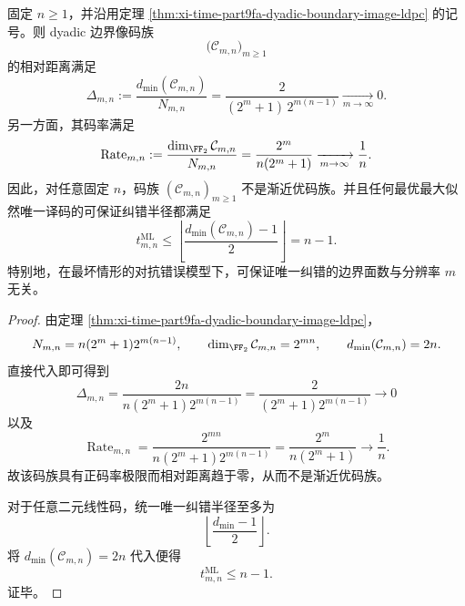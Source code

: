 \begin{corollary}\label{cor:xi-time-part65a-dyadic-boundary-code-not-asymptotically-good}
固定 \(n\ge 1\)，并沿用定理 \ref{thm:xi-time-part9fa-dyadic-boundary-image-ldpc} 的记号。则 dyadic 边界像码族
\[
\bigl(\mathcal C_{m,n}\bigr)_{m\ge 1}
\]
的相对距离满足
\[
\Delta_{m,n}
:=
\frac{d_{\min}(\mathcal C_{m,n})}{N_{m,n}}
=
\frac{2}{(2^m+1)\,2^{m(n-1)}}
\xrightarrow[m\to\infty]{}
0.
\]
另一方面，其码率满足
\[
\operatorname{Rate}_{m,n}
:=
\frac{\dim_{\FF_2}\mathcal C_{m,n}}{N_{m,n}}
=
\frac{2^m}{n(2^m+1)}
\xrightarrow[m\to\infty]{}
\frac1n.
\]
因此，对任意固定 \(n\)，码族 \((\mathcal C_{m,n})_{m\ge 1}\) 不是渐近优码族。并且任何最优最大似然唯一译码的可保证纠错半径都满足
\[
t_{m,n}^{\operatorname{ML}}
\le
\left\lfloor \frac{d_{\min}(\mathcal C_{m,n})-1}{2}\right\rfloor
=
n-1.
\]
特别地，在最坏情形的对抗错误模型下，可保证唯一纠错的边界面数与分辨率 \(m\) 无关。
\end{corollary}
\begin{proof}
由定理 \ref{thm:xi-time-part9fa-dyadic-boundary-image-ldpc}，
\[
N_{m,n}=n(2^m+1)2^{m(n-1)},
\qquad
\dim_{\FF_2}\mathcal C_{m,n}=2^{mn},
\qquad
d_{\min}(\mathcal C_{m,n})=2n.
\]
直接代入即可得到
\[
\Delta_{m,n}
=
\frac{2n}{n(2^m+1)2^{m(n-1)}}
=
\frac{2}{(2^m+1)2^{m(n-1)}}
\to 0
\]
以及
\[
\operatorname{Rate}_{m,n}
=
\frac{2^{mn}}{n(2^m+1)2^{m(n-1)}}
=
\frac{2^m}{n(2^m+1)}
\to \frac1n.
\]
故该码族具有正码率极限而相对距离趋于零，从而不是渐近优码族。

对于任意二元线性码，统一唯一纠错半径至多为
\[
\left\lfloor \frac{d_{\min}-1}{2}\right\rfloor.
\]
将 \(d_{\min}(\mathcal C_{m,n})=2n\) 代入便得
\[
t_{m,n}^{\operatorname{ML}}\le n-1.
\]
证毕。
\end{proof}

